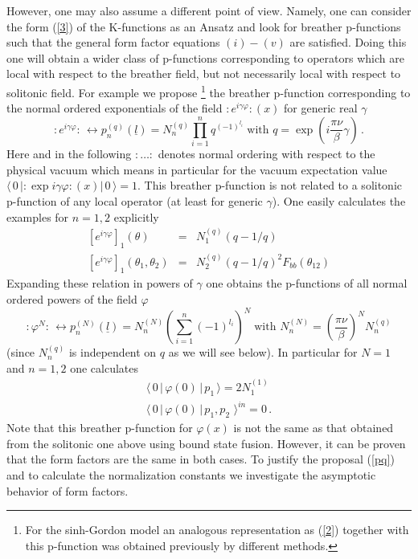 \documentclass[a4paper,12pt]{article}
\begin{document}
However, one may also assume a different point of view. Namely, one can
consider the form (\ref{3}) of the K-functions as an Ansatz and look for
breather p-functions such that the general form factor equations $(i)-(v)$
are satisfied. Doing this one will obtain a wider class of p-functions
corresponding to operators which are local with respect to the breather
field, but not necessarily local with respect to solitonic field. For
example we propose \cite{BK1}\footnote{%
For the sinh-Gordon model an analogous representation as (\ref{2}) together
with this p-function was obtained previously \cite{BL} by different methods.}
the breather p-function corresponding to the normal ordered exponentials of
the field $:\!e^{i\gamma \varphi }\!:\!(x)$ for generic real $\gamma $ 
\begin{equation}
:\!e^{i\gamma \varphi }\!:\,\leftrightarrow p_{n}^{(q)}(\underline{l}%
)=N_{n}^{(q)}\prod_{i=1}^{n}q^{(-1)^{l_{i}}}\;\text{with }q=\exp \left( i%
\frac{\pi \nu }{\beta }\gamma \right) \,.  \label{pq}
\end{equation}
Here and in the following $:\dots :$ denotes normal ordering with respect to
the physical vacuum which means in particular for the vacuum expectation
value $\langle \,0\,|\!:\!\exp i\gamma \varphi \!:\!(x)|\,0\,\rangle =1$. This
breather p-function is not related to a solitonic p-function of any local
operator (at least for generic $\gamma $). One easily calculates the
examples for $n=1,2$ explicitly 
\begin{eqnarray*}
\left[ e^{i\gamma \varphi }\right] _{1}(\theta ) &=&N_{1}^{(q)}\left(
q-1/q\right) \\
\left[ e^{i\gamma \varphi }\right] _{1}(\theta _{1},\theta _{2})
&=&N_{2}^{(q)}\left( q-1/q\right) ^{2}F_{bb}(\theta _{12})
\end{eqnarray*}
Expanding these relation in powers of $\gamma $ one obtains the p-functions
of all normal ordered powers of the field $\varphi $%
\begin{equation}
:\!\varphi ^{N}\!:\,\leftrightarrow p_{n}^{(N)}(\underline{l}%
)=N_{n}^{(N)}\left( \sum_{i=1}^{n}(-1)^{l_{i}}\right) ^{N}\;\text{with }%
N_{n}^{(N)}=\left( \frac{\pi \nu }{\beta }\right) ^{N}N_{n}^{(q)}  \label{pN}
\end{equation}
(since $N_{n}^{(q)}$ is independent on $q$ as we will see below). In
particular for $N=1$ and $n=1,2$ one calculates 
\begin{gather*}
\langle \,0\,|\,\varphi (0)\,|\,p_{1}\,\rangle =2N_{1}^{(1)} \\
\langle \,0\,|\,\varphi (0)\,|\,p_{1},p_{2}\,\,\rangle ^{in}=0\,.
\end{gather*}
Note that this breather p-function for $\varphi (x)$ is not the same as that
obtained from the solitonic one above using bound state fusion. However, it
can be proven \cite{BK2} that the form factors are the same in both cases. To
justify the proposal (\ref{pq}) and to calculate the normalization constants
we investigate the asymptotic behavior of form factors.
\end{document}
